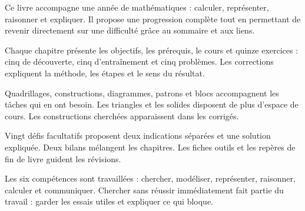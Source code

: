 \clearpage\thispagestyle{otFront}\label{avant-propos}\fontsize{11}{15}\selectfont

Ce livre accompagne une année de mathématiques : calculer, représenter,
raisonner et expliquer. Il propose une progression complète tout en permettant
de revenir directement sur une difficulté grâce au sommaire et aux liens.\par\medskip
\begin{savoirfaire}Chaque chapitre présente les objectifs,
les prérequis, le cours et quinze exercices : cinq de découverte, cinq
d’entraînement et cinq problèmes. Les corrections expliquent la méthode,
les étapes et le sens du résultat.\end{savoirfaire}
\begin{savoirfaire}Quadrillages, constructions,
diagrammes, patrons et blocs accompagnent les tâches qui en ont besoin.
Les triangles et les solides disposent de plus d’espace de cours.
Les constructions cherchées apparaissent dans les corrigés.\end{savoirfaire}
\begin{savoirfaire}Vingt défis facultatifs proposent
deux indications séparées et une solution expliquée. Deux bilans mélangent
les chapitres. Les fiches outils et les repères de fin de livre guident les
révisions.\end{savoirfaire}
Les six compétences sont travaillées : chercher, modéliser, représenter,
raisonner, calculer et communiquer. Chercher sans réussir immédiatement
fait partie du travail : garder les essais utiles et expliquer ce qui bloque.

\clearpage
